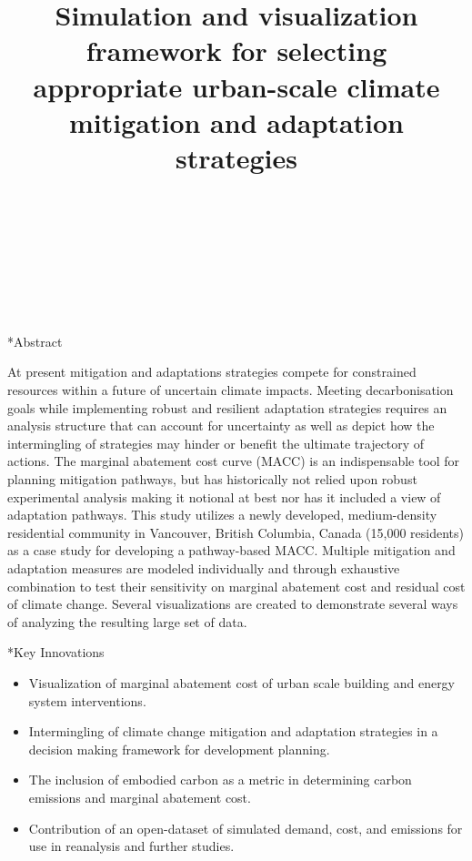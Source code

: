 \documentclass[twocolumn, a4paper,10pt]{article}
\title{%
Simulation and visualization framework for selecting appropriate urban-scale climate mitigation and adaptation strategies} 																																%
\author{																																														%
\\ 																				%
\\ 																																                                                            	%
\\ 																																                                                                %
\\ 			 			  	                                                    %
\\ 														                    	%
\phantom{Line 9}} 																																								            	%
\date{\vspace{-0.5cm}}	%
\makeatletter
\renewcommand\section{\@startsection{section}{1}{\z@}{3pt}{3pt}{\normalfont\large\bfseries}}
\makeatother
\begin{document}
\maketitle

\section*{Abstract}	%
\addtocounter{section}{1}
At present mitigation and adaptations strategies compete for constrained resources within a future of uncertain climate impacts. Meeting decarbonisation goals while implementing robust and resilient adaptation strategies requires an analysis structure that can account for uncertainty as well as depict how the intermingling of strategies may hinder or benefit the ultimate trajectory of actions. The marginal abatement cost curve (MACC) is an indispensable tool for planning mitigation pathways, but has historically not relied upon robust experimental analysis making it notional at best nor has it included a view of adaptation pathways. This study utilizes a newly developed, medium-density residential community in Vancouver, British Columbia, Canada (15,000 residents) as a case study for developing a pathway-based MACC. Multiple mitigation and adaptation measures are modeled individually and through exhaustive combination to test their sensitivity on marginal abatement cost and residual cost of climate change. Several visualizations are created to demonstrate several ways of analyzing the resulting large set of data.   

\section*{Key Innovations}
\begin{itemize}
\item Visualization of marginal abatement cost of urban scale building and energy system interventions.
\item Intermingling of climate change mitigation and adaptation strategies in a decision making framework for development planning.
\item The inclusion of embodied carbon as a metric in determining carbon emissions and marginal abatement cost.
\item Contribution of an open-dataset of simulated demand, cost, and emissions for use in reanalysis and further studies.
\end{itemize}
\end{document}
